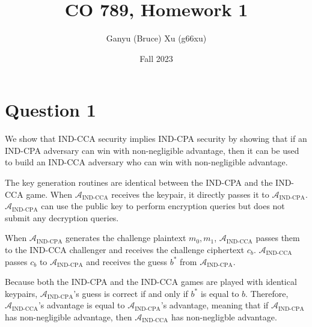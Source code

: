 \documentclass{article}
\title{CO 789, Homework 1}
\author{Ganyu (Bruce) Xu (g66xu)}
\date{Fall 2023}
\newcommand{\indcpa}{\mathcal{A}_\text{IND-CPA}}
\newcommand{\indcca}{\mathcal{A}_\text{IND-CCA}}
\begin{document}

\section*{Question 1}

We show that IND-CCA security implies IND-CPA security by showing that if an IND-CPA adversary can win with non-negligible advantage, then it can be used to build an IND-CCA adversary who can win with non-negligible advantage.

The key generation routines are identical between the IND-CPA and the IND-CCA game. When $\indcca$ receives the keypair, it directly passes it to $\indcpa$. $\indcpa$ can use the public key to perform encryption queries but does not submit any decryption queries.

When $\indcpa$ generates the challenge plaintext $m_0, m_1$, $\indcca$ passes them to the IND-CCA challenger and receives the challenge ciphertext $c_b$. $\indcca$ passes $c_b$ to $\indcpa$ and receives the guess $b^\ast$ from $\indcpa$.

Because both the IND-CPA and the IND-CCA games are played with identical keypairs, $\indcpa$'s guess is correct if and only if $b^\ast$ is equal to $b$. Therefore, $\indcca$'s advantage is equal to $\indcpa$'s advantage, meaning that if $\indcpa$ has non-negligible advantage, then $\indcca$ has non-negligble advantage.
\end{document}
